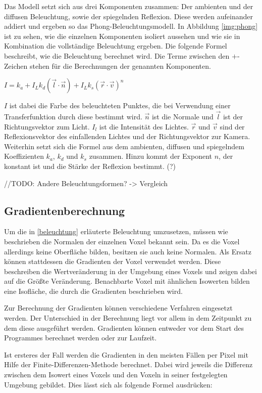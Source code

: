 Das Modell setzt sich aus drei Komponenten zusammen: Der ambienten und der diffusen Beleuchtung, sowie der spiegelnden Reflexion. Diese werden aufeinander addiert und ergeben so das Phong-Beleuchtungsmodell.  In Abbildung \ref{img:phong} ist zu sehen, wie die einzelnen Komponenten isoliert aussehen und wie sie in Kombination die vollständige Beleuchtung ergeben.
Die folgende Formel beschreibt, wie die Beleuchtung berechnet wird. Die Terme zwischen den $+$-Zeichen stehen für die Berechnungen der genannten Komponenten.

$I = k_{a}+I_{L}k_{d}(\vec{l}\cdot\vec{n})+I_{L}k_{s}(\vec{r}\cdot\vec{v})^n$

$I$ ist dabei die Farbe des beleuchteten Punktes, die bei Verwendung einer Transferfunktion durch diese bestimmt wird. $\vec{n}$ ist die Normale und $\vec{l}$ ist der Richtungsvektor zum Licht. $I_{l}$ ist die Intensität des Lichtes. $\vec{r}$ und $\vec{v}$ sind der Reflexionsvektor des einfallenden Lichtes und der Richtungsvektor zur Kamera. Weiterhin setzt sich die Formel aus dem ambienten, diffusen und spiegelndem Koeffizienten $k_{a}$, $k_{d}$ und $k_{s}$ zusammen. Hinzu kommt der Exponent $n$, der konstant ist und die Stärke der Reflexion bestimmt. (?)

\cite{phong75}
//TODO: Andere Beleuchtungsformen? -> Vergleich

\subsection{Gradientenberechnung}

Um die in \ref{beleuchtung} erläuterte Beleuchtung umzusetzen, müssen wie beschrieben die Normalen der einzelnen Voxel bekannt sein. Da es die Voxel allerdings keine Oberfläche bilden, besitzen sie auch keine Normalen. Als Ersatz können stattdessen die Gradienten der Voxel verwendet werden. Diese beschreiben die Wertveränderung in der Umgebung eines Voxels und zeigen dabei auf die Größte Veränderung. Benachbarte Voxel mit ähnlichen Isowerten bilden eine Isofläche, die durch die Gradienten beschrieben wird. 

Zur Berechnung der Gradienten können verschiedene Verfahren eingesetzt werden. Der Unterschied in der Berechnung liegt vor allem in dem Zeitpunkt zu dem diese ausgeführt werden. Gradienten können entweder vor dem Start des Programmes berechnet werden oder zur Laufzeit. 

Ist ersteres der Fall werden die Gradienten in den meisten Fällen per Pixel mit Hilfe der Finite-Differenzen-Methode berechnet. 
Dabei wird jeweils die Differenz zwischen dem Isowert eines Voxels und den Voxeln in seiner festgelegten Umgebung gebildet. Dies lässt sich als folgende Formel ausdrücken: 


